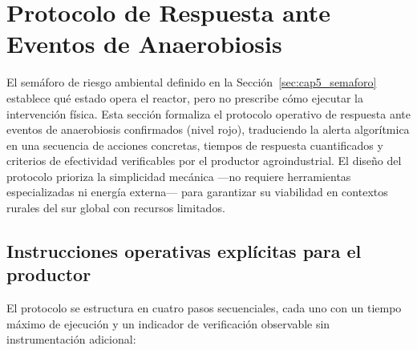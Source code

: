\section{Protocolo de Respuesta ante Eventos de Anaerobiosis}
\label{sec:cap5_protocolo}

El semáforo de riesgo ambiental definido en la Sección~\ref{sec:cap5_semaforo} establece qué estado opera el reactor, pero no prescribe cómo ejecutar la intervención física. Esta sección formaliza el protocolo operativo de respuesta ante eventos de anaerobiosis confirmados (nivel rojo), traduciendo la alerta algorítmica en una secuencia de acciones concretas, tiempos de respuesta cuantificados y criterios de efectividad verificables por el productor agroindustrial. El diseño del protocolo prioriza la simplicidad mecánica ---no requiere herramientas especializadas ni energía externa--- para garantizar su viabilidad en contextos rurales del sur global con recursos limitados.

\subsection{Instrucciones operativas explícitas para el productor}
\label{subsec:cap5_instrucciones_operativas}

El protocolo se estructura en cuatro pasos secuenciales, cada uno con un tiempo máximo de ejecución y un indicador de verificación observable sin instrumentación adicional:

